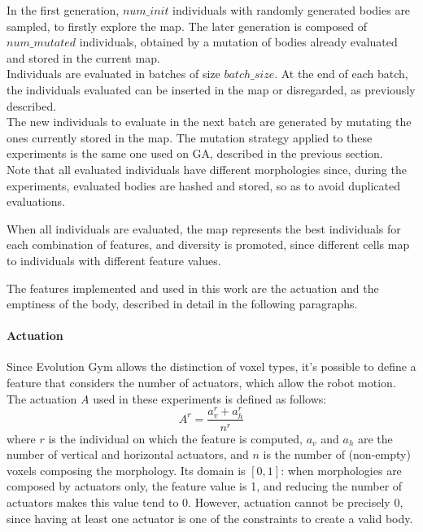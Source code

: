 In the first generation, $num\_init$ individuals with randomly generated bodies are sampled, to firstly explore the map. The later generation is composed of $num\_mutated$ individuals, obtained by a mutation of bodies already evaluated and stored in the current map.\\
Individuals are evaluated in batches of size $batch\_size$.
At the end of each batch, the individuals evaluated can be inserted in the map or disregarded, as previously described.\\
The new individuals to evaluate in the next batch are generated by mutating the ones currently stored in the map.
The mutation strategy applied to these experiments is the same one used on GA, described in the previous section.\\
Note that all evaluated individuals have different morphologies since, during the experiments, evaluated bodies are hashed and stored, so as to avoid duplicated evaluations.

When all individuals are evaluated, the map represents the best individuals for each combination of features, and diversity is promoted, since different cells map to individuals with different feature values.

The features implemented and used in this work are the actuation and the emptiness of the body, described in detail in the following paragraphs.

\paragraph{Actuation}
Since Evolution Gym allows the distinction of voxel types, it's possible to define a feature that considers the number of actuators, which allow the robot motion.\\
The actuation $A$ used in these experiments is defined as follows:
\[A^r = \dfrac{a^r_v + a^r_h}{n^r}\]
where $r$ is the individual on which the feature is computed, $a_v$ and $a_h$ are  the number of vertical and horizontal actuators, and $n$ is the number of (non-empty) voxels composing the morphology.
Its domain is $[0, 1]$: when morphologies are composed by actuators only, the feature value is 1, and reducing the number of actuators makes this value tend to 0. However, actuation cannot be precisely 0, since having at least one actuator is one of the constraints to create a valid body.

